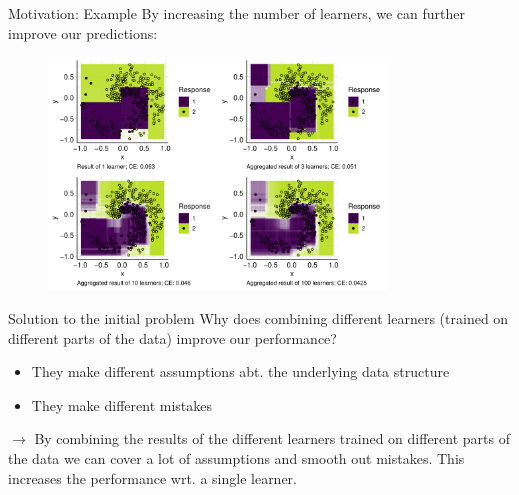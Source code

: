 \documentclass[11pt,compress,t,notes=noshow, xcolor=table]{beamer}
\begin{document}
\begin{vbframe}{Motivation: Example}
By increasing the number of learners, we can further improve our predictions:
\begin{figure}
\includegraphics[width=0.8\textwidth]{figure/cart_forest_overview_6.pdf}
\end{figure}
\end{vbframe}

\begin{vbframe}{Solution to the initial problem}
Why does combining different learners (trained on different parts of the data) improve our performance?
\begin{itemize}
  \item They make different assumptions abt. the
  underlying data structure
  \item They make different mistakes
\end{itemize}
$\rightarrow$ By combining  the results of the different learners trained on different parts of the data we can cover a lot of assumptions and smooth out mistakes. This increases the performance wrt. a single learner.
\end{vbframe}
\end{document}
